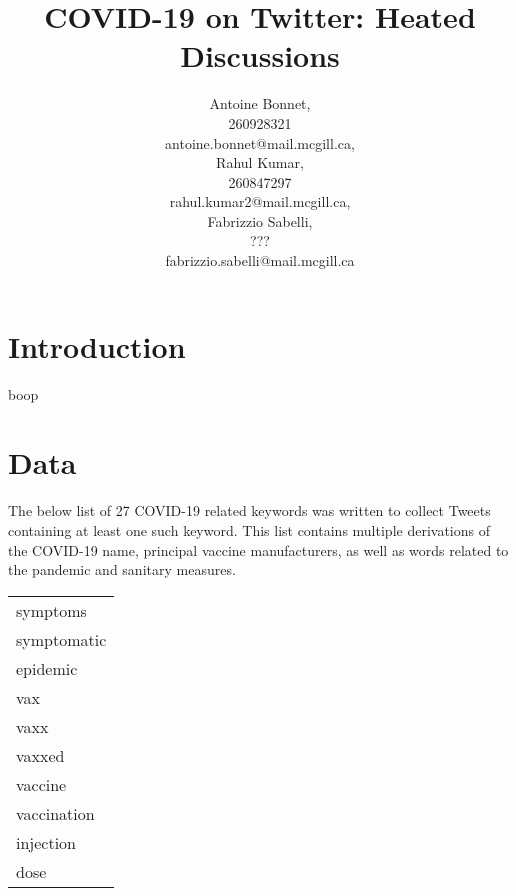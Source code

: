 \documentclass[letterpaper]{article} %
\title{COVID-19 on Twitter: Heated Discussions}
\author{Antoine Bonnet, \\
  260928321 \\
antoine.bonnet@mail.mcgill.ca,
\\[3ex]
Rahul Kumar,\\
260847297\\
rahul.kumar2@mail.mcgill.ca, 
\\[3ex]
Fabrizzio Sabelli,\\
???\\
fabrizzio.sabelli@mail.mcgill.ca}
\begin{document}
\maketitle

\section{Introduction}
boop

\section{Data}
\noindent The below list of 27 COVID-19 related keywords was written to collect Tweets containing at least one such keyword. This list contains multiple derivations of the COVID-19 name, principal vaccine manufacturers, as well as words related to the pandemic and sanitary measures. 

\hfill
\begin{tabular}[t]{ l }
  symptoms \\ symptomatic \\ epidemic \\ vax \\ vaxx \\ vaxxed \\ vaccine \\ vaccination \\injection \\ dose 
\end{tabular}\hfill
{}
\end{document}

